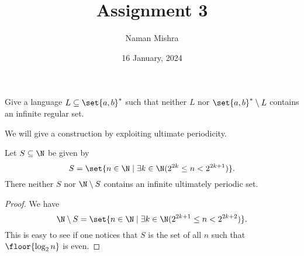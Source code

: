 \documentclass[12pt]{article}
\title{Assignment 3} \setcounter{assignment}{3}
\author{Naman Mishra}
\date{16 January, 2024}
\begin{document}
\maketitle
\begin{problem*}
    Give a language $L \subseteq \set{a, b}^*$ such that neither $L$ nor
    $\set{a, b}^* \setminus L$ contains an infinite regular set.
\end{problem*}
We will give a construction by exploiting ultimate periodicity.
\setcounter{section}{3}
\begin{lemma*}
    Let $S \subseteq \N$ be given by \[
        S = \set{n \in \N \mid \exists k \in \N (2^{2k} \le n < 2^{2k+1})}.
    \]
    There neither $S$ nor $\N \setminus S$ contains an
    infinite ultimately periodic set.
\end{lemma*}
\begin{proof}
    We have \[
        \N \setminus S
            = \set{n \in \N \mid \exists k \in \N
            (2^{2k+1} \le n < 2^{2k+2})}.
    \] This is easy to see if one notices that $S$ is the set of all $n$
    such that $\floor{\log_2 n}$ is even.


\end{proof}
\end{document}

